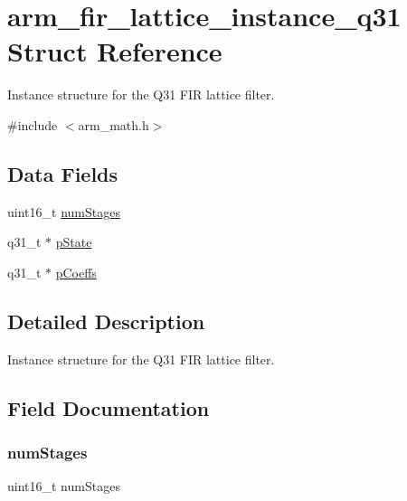 \hypertarget{structarm__fir__lattice__instance__q31}{}\section{arm\+\_\+fir\+\_\+lattice\+\_\+instance\+\_\+q31 Struct Reference}
\label{structarm__fir__lattice__instance__q31}


Instance structure for the Q31 F\+IR lattice filter.  




{\ttfamily \#include $<$arm\+\_\+math.\+h$>$}

\subsection*{Data Fields}
\begin{DoxyCompactItemize}
\item 
uint16\+\_\+t \hyperlink{structarm__fir__lattice__instance__q31_a4cceb90547b3e585d4c7aabaa8057212}{num\+Stages}
\item 
q31\+\_\+t $\ast$ \hyperlink{structarm__fir__lattice__instance__q31_adee4ba3ee8869865af7d8fa08ca913d6}{p\+State}
\item 
q31\+\_\+t $\ast$ \hyperlink{structarm__fir__lattice__instance__q31_a68888e36167d81cb7836db10367a1682}{p\+Coeffs}
\end{DoxyCompactItemize}


\subsection{Detailed Description}
Instance structure for the Q31 F\+IR lattice filter. 

\subsection{Field Documentation}
\mbox{\label{structarm__fir__lattice__instance__q31_a4cceb90547b3e585d4c7aabaa8057212}} 
\subsubsection{\texorpdfstring{num\+Stages}{numStages}}
{\footnotesize\ttfamily uint16\+\_\+t num\+Stages}

